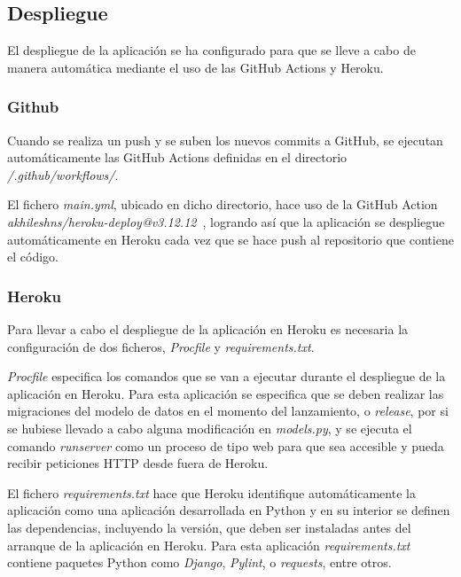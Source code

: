 \documentclass[a4paper, 12pt]{book}
\begin{document}
\subsection{Despliegue}
\label{subsec:diseño_despliegue}

El despliegue de la aplicación se ha configurado para que se lleve a cabo de manera automática mediante el uso de las GitHub Actions y Heroku.

\subsubsection{Github}
\label{subsubsec:despliegue_github}

Cuando se realiza un push y se suben los nuevos commits a GitHub, se ejecutan automáticamente las GitHub Actions definidas en el directorio \textit{/.github/workflows/}.

El fichero \textit{main.yml}, ubicado en dicho directorio, hace uso de la GitHub Action \textit{akhileshns/heroku-deploy@v3.12.12}~\cite{herokudeploy}, logrando así que la aplicación se despliegue automáticamente en Heroku cada vez que se hace push al repositorio que contiene el código.

\subsubsection{Heroku}
\label{subsubsec:despliegue_heroku}
Para llevar a cabo el despliegue de la aplicación en Heroku es necesaria la configuración de dos ficheros, \textit{Procfile} y \textit{requirements.txt}.

\textit{Procfile} especifica los comandos que se van a ejecutar durante el despliegue de la aplicación en Heroku.
Para esta aplicación se especifica que se deben realizar las migraciones del modelo de datos en el momento del lanzamiento, o \textit{release}, por si se hubiese llevado a cabo alguna modificación en \textit{models.py}, y se ejecuta el comando \textit{runserver} como un proceso de tipo web para que sea accesible y pueda recibir peticiones HTTP desde fuera de Heroku.

El fichero \textit{requirements.txt} hace que Heroku identifique automáticamente la aplicación como una aplicación desarrollada en Python y en su interior se definen las dependencias, incluyendo la versión, que deben ser instaladas antes del arranque de la aplicación en Heroku.
Para esta aplicación \textit{requirements.txt} contiene paquetes Python como \textit{Django}, \textit{Pylint}, o \textit{requests}, entre otros.
\end{document}
